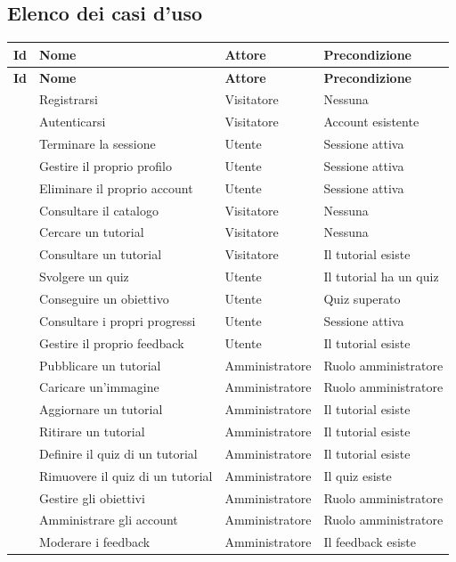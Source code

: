 \subsection{Elenco dei casi d'uso}

\begin{longtable}{@{}l L{4.6cm} L{2.4cm} L{4.6cm}@{}}
\toprule
\textbf{Id} & \textbf{Nome} & \textbf{Attore} & \textbf{Precondizione} \\
\midrule
\endfirsthead
\toprule
\textbf{Id} & \textbf{Nome} & \textbf{Attore} & \textbf{Precondizione} \\
\midrule
\endhead
\bottomrule
\endlastfoot

 & Registrarsi                      & Visitatore     & Nessuna \\
 & Autenticarsi                     & Visitatore     & Account esistente \\
 & Terminare la sessione            & Utente         & Sessione attiva \\
 & Gestire il proprio profilo       & Utente         & Sessione attiva \\
 & Eliminare il proprio account     & Utente         & Sessione attiva \\
 & Consultare il catalogo           & Visitatore     & Nessuna \\
 & Cercare un tutorial              & Visitatore     & Nessuna \\
 & Consultare un tutorial           & Visitatore     & Il tutorial esiste \\
 & Svolgere un quiz                 & Utente         & Il tutorial ha un quiz \\
 & Conseguire un obiettivo          & Utente         & Quiz superato \\
 & Consultare i propri progressi    & Utente         & Sessione attiva \\
 & Gestire il proprio feedback      & Utente         & Il tutorial esiste \\
 & Pubblicare un tutorial           & Amministratore & Ruolo amministratore \\
 & Caricare un'immagine             & Amministratore & Ruolo amministratore \\
 & Aggiornare un tutorial           & Amministratore & Il tutorial esiste \\
 & Ritirare un tutorial             & Amministratore & Il tutorial esiste \\
 & Definire il quiz di un tutorial  & Amministratore & Il tutorial esiste \\
 & Rimuovere il quiz di un tutorial & Amministratore & Il quiz esiste \\
 & Gestire gli obiettivi            & Amministratore & Ruolo amministratore \\
 & Amministrare gli account         & Amministratore & Ruolo amministratore \\
 & Moderare i feedback              & Amministratore & Il feedback esiste \\


\end{longtable}
